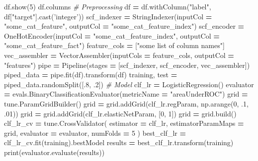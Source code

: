 \documentclass[]{book}
\newenvironment{Shaded}{\begin{snugshade}}{\end{snugshade}}
\newcommand{\DecValTok}[1]{\textcolor[rgb]{0.00,0.00,0.81}{#1}}
\newcommand{\StringTok}[1]{\textcolor[rgb]{0.31,0.60,0.02}{#1}}
\newcommand{\CommentTok}[1]{\textcolor[rgb]{0.56,0.35,0.01}{\textit{#1}}}
\newcommand{\OperatorTok}[1]{\textcolor[rgb]{0.81,0.36,0.00}{\textbf{#1}}}
\newcommand{\BuiltInTok}[1]{#1}
\newcommand{\NormalTok}[1]{#1}
\begin{document}
\begin{Shaded}
\begin{Highlighting}[]
\NormalTok{df.show(}\DecValTok{5}\NormalTok{)}
\NormalTok{df.columns}
\CommentTok{# Preprocessing}
\NormalTok{df }\OperatorTok{=}\NormalTok{ df.withColumn(}\StringTok{"label"}\NormalTok{, df[}\StringTok{"target"}\NormalTok{].cast(}\StringTok{'integer'}\NormalTok{))}
\NormalTok{scf_indexer }\OperatorTok{=}\NormalTok{ StringIndexer(inputCol }\OperatorTok{=} \StringTok{"some_cat_feature"}\NormalTok{, outputCol }\OperatorTok{=} \StringTok{"some_cat_feature_index"}\NormalTok{)}
\NormalTok{scf_encoder }\OperatorTok{=}\NormalTok{ OneHotEncoder(inputCol }\OperatorTok{=} \StringTok{"some_cat_feature_index"}\NormalTok{, outputCol }\OperatorTok{=} \StringTok{"some_cat_feature_fact"}\NormalTok{)}
\NormalTok{feature_cols }\OperatorTok{=}\NormalTok{ [}\StringTok{"some list of column names"}\NormalTok{]}
\NormalTok{vec_assembler }\OperatorTok{=}\NormalTok{ VectorAssembler(inputCols }\OperatorTok{=}\NormalTok{ feature_cols, }
\NormalTok{                                outputCol }\OperatorTok{=} \StringTok{"features"}\NormalTok{)}
\NormalTok{pipe }\OperatorTok{=}\NormalTok{ Pipeline(stages }\OperatorTok{=}\NormalTok{ [scf_indexer, scf_encoder, vec_assembler])}
\NormalTok{piped_data }\OperatorTok{=}\NormalTok{ pipe.fit(df).transform(df)}
\NormalTok{training, test }\OperatorTok{=}\NormalTok{ piped_data.randomSplit([.}\DecValTok{8}\NormalTok{, .}\DecValTok{2}\NormalTok{])}
\CommentTok{# Model}
\NormalTok{clf_lr }\OperatorTok{=}\NormalTok{ LogisticRegression()}
\NormalTok{evaluator }\OperatorTok{=}\NormalTok{ evals.BinaryClassificationEvaluator(metricName }\OperatorTok{=} \StringTok{"areaUnderROC"}\NormalTok{)}
\NormalTok{grid }\OperatorTok{=}\NormalTok{ tune.ParamGridBuilder()}
\NormalTok{grid }\OperatorTok{=}\NormalTok{ grid.addGrid(clf_lr.regParam, np.arange(}\DecValTok{0}\NormalTok{, .}\DecValTok{1}\NormalTok{, .}\DecValTok{01}\NormalTok{))}
\NormalTok{grid }\OperatorTok{=}\NormalTok{ grid.addGrid(clf_lr.elasticNetParam, [}\DecValTok{0}\NormalTok{, }\DecValTok{1}\NormalTok{])}
\NormalTok{grid }\OperatorTok{=}\NormalTok{ grid.build()}
\NormalTok{clf_lr_cv }\OperatorTok{=}\NormalTok{ tune.CrossValidator(}
\NormalTok{    estimator }\OperatorTok{=}\NormalTok{ clf_lr,}
\NormalTok{    estimatorParamMaps }\OperatorTok{=}\NormalTok{ grid,}
\NormalTok{    evaluator }\OperatorTok{=}\NormalTok{ evaluator,}
\NormalTok{    numFolds }\OperatorTok{=} \DecValTok{5}
\NormalTok{               )}
\NormalTok{best_clf_lr }\OperatorTok{=}\NormalTok{ clf_lr_cv.fit(training).bestModel}
\NormalTok{results }\OperatorTok{=}\NormalTok{ best_clf_lr.transform(training)}
\BuiltInTok{print}\NormalTok{(evaluator.evaluate(results))}

\end{Highlighting}
\end{Shaded}
\end{document}
